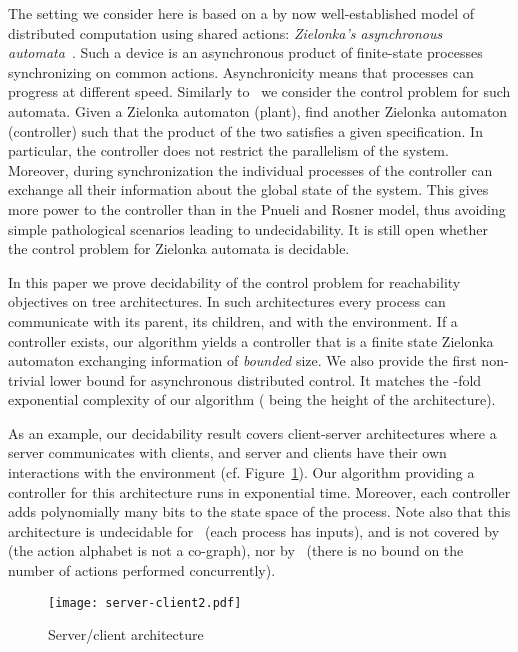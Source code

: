 \documentclass{llncs}
\begin{document}
The setting we consider here is based on a by
now well-established model of distributed computation using
shared actions: \emph{Zielonka's asynchronous
  automata}~\cite{zie87}. Such a device is an asynchronous product of
finite-state processes synchronizing on common actions.  
Asynchronicity means that processes can progress at different speed. 
Similarly to~\cite{GLZ04,MTY05} 
we consider the control problem for such automata. 
Given a Zielonka automaton (plant), find another Zielonka automaton
(controller) such that the product of the two satisfies a given
specification. In particular, the controller does
not restrict the parallelism of the system.
Moreover, during synchronization the individual processes of the controller
can exchange all their 
information about the global state of the system. This gives more
power to the controller than in the Pnueli and Rosner model, thus
avoiding simple pathological scenarios leading to undecidability. 
It is still open whether the control problem for Zielonka automata is
decidable.  

In this paper we prove decidability of the control problem  for
reachability objectives on tree architectures. 
In such architectures every process can communicate with its parent,
its children, and with the environment. 
If a controller exists, our algorithm yields a controller that is a
finite state Zielonka automaton exchanging information of
\emph{bounded} size.  We also provide the first non-trivial lower bound for
asynchronous distributed control. It matches the -fold exponential
complexity of our algorithm ( being the height of the
architecture). 


As an example, our decidability result covers client-server
architectures where a server communicates with clients, and server and
clients have their own interactions with the environment
(cf. Figure~\ref{fig:server-client}). Our algorithm providing a
controller for this architecture runs in exponential time. Moreover,
each controller adds polynomially many bits to the state space of the
process.  Note also that this architecture is undecidable
for~\cite{PR90} (each process has inputs), and is not covered
by~\cite{GLZ04} (the action alphabet is not a co-graph), nor
by~\cite{MTY05} (there is no bound on the number of actions performed
concurrently).
\begin{figure}[b]
\centering
  \vspace{-0.7cm}
  \texttt{[image: server-client2.pdf]}
\caption{Server/client architecture}
  \label{fig:server-client}
\end{figure}
\medskip
\end{document}
